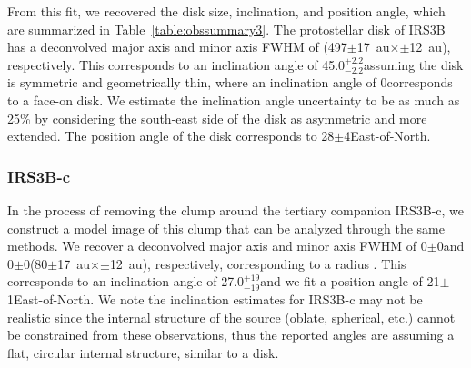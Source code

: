 \documentclass[twocolumn, 12pt, trackchanges]{aastex63}
\begin{document}
From this fit, we recovered the disk size, inclination, and position angle, which are summarized in Table~\ref{table:obssummary3}. The protostellar disk of IRS3B has a deconvolved major axis and minor axis FWHM of  (497$\pm$17~au\space $\times$$\pm$12~au), respectively. This corresponds to an inclination angle of 45.0\deg$^{+2.2}_{-2.2}$\space assuming the disk is symmetric and geometrically thin, where an inclination angle of 0\deg\space corresponds to a face-on disk. We estimate the inclination angle uncertainty to be as much as 25\% \space by considering the south-east side of the disk as asymmetric and more extended. The position angle of the disk corresponds to 28$\pm$4\deg\space East-of-North. 

\subsubsection{IRS3B-c}
In the process of removing the clump around the tertiary companion IRS3B-c, we construct a model image of this clump that can be analyzed through the same methods. We recover a deconvolved major axis and minor axis FWHM of 0$\pm$0\space and 0$\pm$0\space (80$\pm$17~au\space $\times$$\pm$12~au), respectively, corresponding to a radius . This corresponds to an inclination angle of 27.0\deg$^{+19}_{-19}$\space and we fit a position angle of 21$\pm$1\deg\space East-of-North. We note the inclination estimates for IRS3B-c may not be realistic since the internal structure of the source (oblate, spherical, etc.) cannot be constrained from these observations, thus the reported angles are assuming a flat, circular internal structure, similar to a disk.
\end{document}

